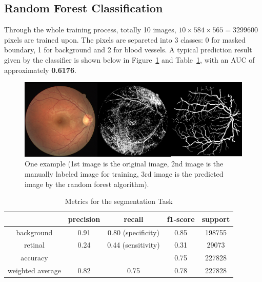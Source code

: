 \documentclass[final]{article}
\begin{document}
\subsection{Random Forest Classification}
Through the whole training process, totally 10 images, \(10 \times 584 \times 565 = 3299600\) pixels are trained upon. The pixels are separeted into 3 classes: 0 for masked boundary, 1 for background and 2 for blood vessels. A typical prediction result given by the classifier is shown below in Figure~\ref{fig:mjct27} and Table~\ref{tab:mjct27}, with an AUC of approximately \textbf{0.6176}. 
\begin{figure}[H]
    \centering
        \centering
        \includegraphics[scale=0.2]{Figures/mjc.png}
        \caption{One example (1st image is the original image, 2nd image is the manually labeled image for training, 3rd image is the predicted image by the random forest algorithm).}\label{fig:mjct27}
\end{figure}
\vspace{-0.75cm}
\begin{table}[H]
    \centering
    \caption{Metrics for the segmentation Task}
    \begin{tabular}{ccccc}
    \toprule
                     & precision & recall & f1-score & support \\
    \midrule
    background       & 0.91      & 0.80 (specificity) & 0.85     & 198755  \\
    retinal          & 0.24      & 0.44 (sensitivity) & 0.31     & 29073   \\
    accuracy         &           &        & 0.75      & 227828  \\
    weighted average & 0.82      & 0.75   & 0.78      & 227828  \\
    \bottomrule
    \end{tabular}
    \label{tab:mjct27}
\end{table}
\end{document}
